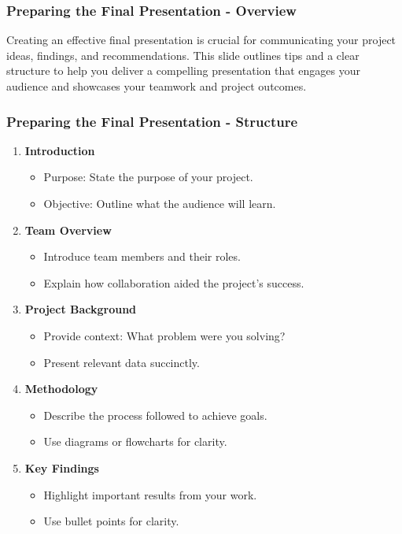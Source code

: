 \documentclass[aspectratio=169]{beamer}
\begin{document}
\begin{frame}[fragile]
    \frametitle{Preparing the Final Presentation - Overview}
    Creating an effective final presentation is crucial for communicating your project ideas, findings, and recommendations. This slide outlines tips and a clear structure to help you deliver a compelling presentation that engages your audience and showcases your teamwork and project outcomes.
\end{frame}

\begin{frame}[fragile]
    \frametitle{Preparing the Final Presentation - Structure}
    \begin{enumerate}
        \item \textbf{Introduction}
        \begin{itemize}
            \item Purpose: State the purpose of your project.
            \item Objective: Outline what the audience will learn.
        \end{itemize}
        
        \item \textbf{Team Overview}
        \begin{itemize}
            \item Introduce team members and their roles.
            \item Explain how collaboration aided the project’s success.
        \end{itemize}
        
        \item \textbf{Project Background}
        \begin{itemize}
            \item Provide context: What problem were you solving?
            \item Present relevant data succinctly.
        \end{itemize}
        
        \item \textbf{Methodology}
        \begin{itemize}
            \item Describe the process followed to achieve goals.
            \item Use diagrams or flowcharts for clarity.
        \end{itemize}
        
        \item \textbf{Key Findings}
        \begin{itemize}
            \item Highlight important results from your work.
            \item Use bullet points for clarity.
        \end{itemize}
    \end{enumerate}
\end{frame}
\end{document}
